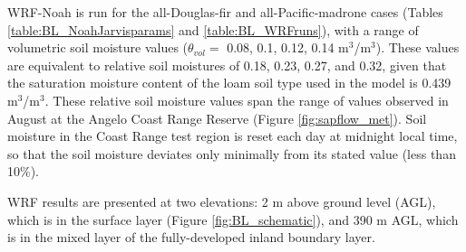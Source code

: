 WRF-Noah is run for the all-Douglas-fir and all-Pacific-madrone cases (Tables \ref{table:BL_NoahJarvisparams} and \ref{table:BL_WRFruns}), with a range of volumetric soil moisture values ($\theta_{vol} =$ 0.08, 0.1, 0.12, 0.14 m$^3$/m$^3$).  These values are equivalent to relative soil moistures of 0.18, 0.23, 0.27, and 0.32, given that the saturation moisture content of the loam soil type used in the model is 0.439 m$^3$/m$^3$.  These relative soil moisture values span the range of values observed in August at the Angelo Coast Range Reserve (Figure \ref{fig:sapflow_met}).  Soil moisture in the Coast Range test region is reset each day at midnight local time, so that the soil moisture deviates only minimally from its stated value (less than 10\%).

WRF results are presented at two elevations: 2 m above ground level (AGL), which is in the surface layer (Figure \ref{fig:BL_schematic}), and 390 m AGL, which is in the mixed layer of the fully-developed inland boundary layer.
